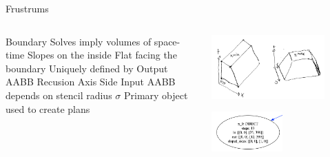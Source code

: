 \begin{frame}{Frustrums}
  \begin{columns}
  \begin{outline}
  \1 Boundary Solves imply volumes of space-time 
  \1 Slopes on the inside
  \1 Flat facing the boundary
  \1 Uniquely defined by
  \2 Output AABB
  \2 Recusion Axis
  \2 Side
  \1 Input AABB depends on stencil radius $\sigma$
  \1 Primary object used to create plans
  \end{outline}

  \begin{center}
  \centering
  \includegraphics[width=0.8\textwidth]{frustrum_examples.png}

  \includegraphics[width=0.5\textwidth]{direct_node.png}
  \end{center}
\end{columns}
\end{frame}

